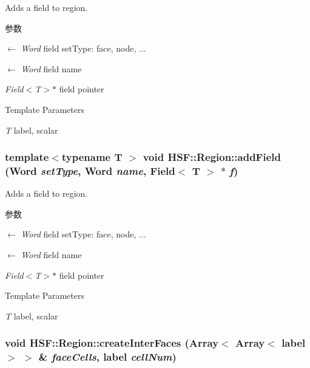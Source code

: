 Adds a field to region. 
\begin{DoxyParams}{参数}
\item[\mbox{$\leftarrow$} {\em Word}]field setType: face, node, ... \item[\mbox{$\leftarrow$} {\em Word}]field name \item[{\em Field$<$T$>$$\ast$}]field pointer \end{DoxyParams}

\begin{DoxyTemplParams}{Template Parameters}
\item[{\em T}]label, scalar \end{DoxyTemplParams}
\hypertarget{classHSF_1_1Region_aec3f0520f9618a0e0d92a5c2a102b980}{
\subsubsection[{addField}]{\setlength{\rightskip}{0pt plus 5cm}template$<$typename T $>$ void HSF::Region::addField (Word {\em setType}, \/  Word {\em name}, \/  {\bf Field}$<$ T $>$ $\ast$ {\em f})}}
\label{classHSF_1_1Region_aec3f0520f9618a0e0d92a5c2a102b980}


Adds a field to region. 
\begin{DoxyParams}{参数}
\item[\mbox{$\leftarrow$} {\em Word}]field setType: face, node, ... \item[\mbox{$\leftarrow$} {\em Word}]field name \item[{\em Field$<$T$>$$\ast$}]field pointer \end{DoxyParams}

\begin{DoxyTemplParams}{Template Parameters}
\item[{\em T}]label, scalar \end{DoxyTemplParams}
\hypertarget{classHSF_1_1Region_a39c7b59ebdc736618d652d53d1dace0b}{
\subsubsection[{createInterFaces}]{\setlength{\rightskip}{0pt plus 5cm}void HSF::Region::createInterFaces (Array$<$ Array$<$ label $>$ $>$ \& {\em faceCells}, \/  label {\em cellNum})}}
\label{classHSF_1_1Region_a39c7b59ebdc736618d652d53d1dace0b}


